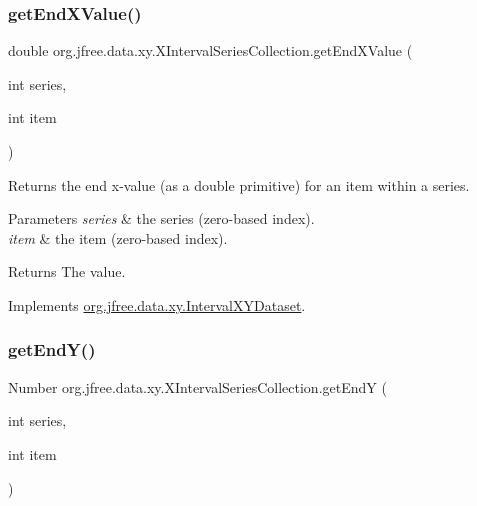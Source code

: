\subsubsection{\texorpdfstring{get\+End\+X\+Value()}{getEndXValue()}}
{\footnotesize\ttfamily double org.\+jfree.\+data.\+xy.\+X\+Interval\+Series\+Collection.\+get\+End\+X\+Value (\begin{DoxyParamCaption}\item[{int}]{series,  }\item[{int}]{item }\end{DoxyParamCaption})}

Returns the end x-\/value (as a double primitive) for an item within a series.


\begin{DoxyParams}{Parameters}
{\em series} & the series (zero-\/based index). \\
\hline
{\em item} & the item (zero-\/based index).\\
\hline
\end{DoxyParams}
\begin{DoxyReturn}{Returns}
The value. 
\end{DoxyReturn}


Implements \mbox{\hyperlink{interfaceorg_1_1jfree_1_1data_1_1xy_1_1_interval_x_y_dataset_ad976e66caa1fc4d72a599f2c26c55dcc}{org.\+jfree.\+data.\+xy.\+Interval\+X\+Y\+Dataset}}.

\mbox{\label{classorg_1_1jfree_1_1data_1_1xy_1_1_x_interval_series_collection_aea748f575e39ffb8faf923a15d7f3792}} 
\subsubsection{\texorpdfstring{get\+End\+Y()}{getEndY()}}
{\footnotesize\ttfamily Number org.\+jfree.\+data.\+xy.\+X\+Interval\+Series\+Collection.\+get\+EndY (\begin{DoxyParamCaption}\item[{int}]{series,  }\item[{int}]{item }\end{DoxyParamCaption})}

